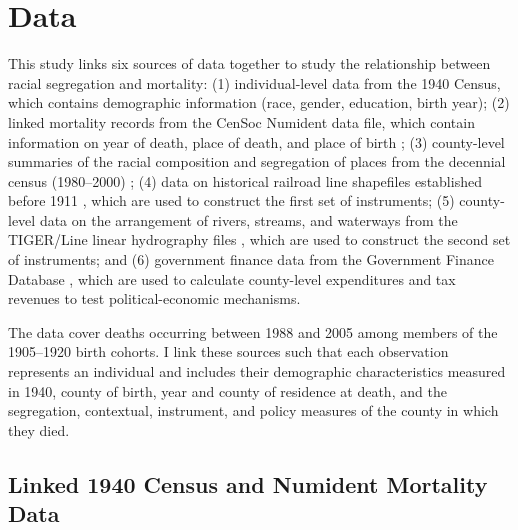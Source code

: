 \documentclass[11pt]{article}
\begin{document}
\section{Data}

This study links six sources of data together to study the relationship between racial segregation and mortality: (1) individual-level data from the 1940 Census, which contains demographic information (race, gender, education, birth year); (2) linked mortality records from the CenSoc Numident data file, which contain information on year of death, place of death, and place of birth \citep{breen_censoc_2023}; (3) county-level summaries of the racial composition and segregation of places from the decennial census (1980--2000) \citep{ruggles_ipums_2023}; (4) data on historical railroad line shapefiles established before 1911 \citep{atack_historical_2016}, which are used to construct the first set of instruments; (5) county-level data on the arrangement of rivers, streams, and waterways from the TIGER/Line linear hydrography files \citep{census_tiger_2023}, which are used to construct the second set of instruments; and (6) government finance data from the Government Finance Database \citep{pierson_government_2015}, which are used to calculate county-level expenditures and tax revenues to test political-economic mechanisms.

The data cover deaths occurring between 1988 and 2005 among members of the 1905--1920 birth cohorts.
I link these sources such that each observation represents an individual and includes their demographic characteristics measured in 1940, county of birth, year and county of residence at death, and the segregation, contextual, instrument, and policy measures of the county in which they died.

\subsection{Linked 1940 Census and Numident Mortality Data}
\end{document}
